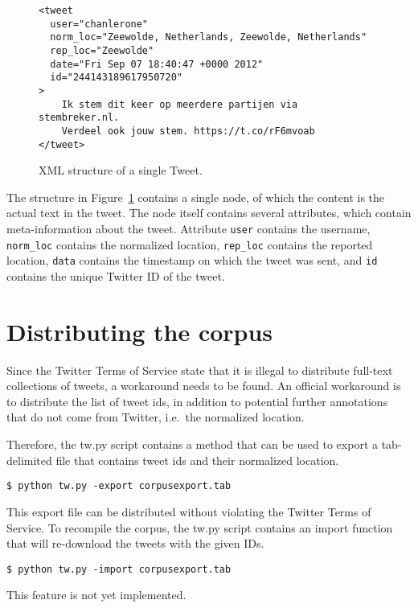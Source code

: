 \documentclass[a4paper,11pt]{article}
\begin{document}
\begin{figure}[htbp]
\begin{verbatim}
<tweet
  user="chanlerone" 
  norm_loc="Zeewolde, Netherlands, Zeewolde, Netherlands" 
  rep_loc="Zeewolde" 
  date="Fri Sep 07 18:40:47 +0000 2012" 
  id="244143189617950720"
>
    Ik stem dit keer op meerdere partijen via stembreker.nl.
    Verdeel ook jouw stem. https://t.co/rF6mvoab
</tweet>

\end{verbatim}
\caption{XML structure of a single Tweet.}
\label{fig:xml}
\end{figure}

The structure in Figure~\ref{fig:xml} contains a single node, of which the content is the actual text in the tweet. The node itself contains several attributes, which contain meta-information about the tweet. Attribute \texttt{user} contains the username, \texttt{norm\_loc} contains the normalized location, \texttt{rep\_loc} contains the reported location, \texttt{data} contains the timestamp on which the tweet was sent, and \texttt{id} contains the unique Twitter ID of the tweet.

\section{Distributing the corpus}

Since the Twitter Terms of Service state that it is illegal to distribute full-text collections of tweets, a workaround needs to be found. An official workaround is to distribute the list of tweet ids, in addition to potential further annotations that do not come from Twitter, i.e.~the normalized location.

Therefore, the tw.py script contains a method that can be used to export a tab-delimited file that contains tweet ids and their normalized location.

\begin{verbatim}
$ python tw.py -export corpusexport.tab
\end{verbatim}

This export file can be distributed without violating the Twitter Terms of Service. To recompile the corpus, the tw.py script contains an import function that will re-download the tweets with the given IDs.

\begin{verbatim}
$ python tw.py -import corpusexport.tab
\end{verbatim}

This feature is not yet implemented.
\end{document}
